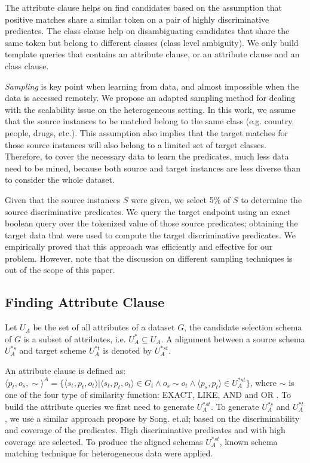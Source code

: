 The attribute clause helps on find candidates based on the assumption that positive matches share a similar token on a pair of highly discriminative predicates. The class clause help on disambiguating candidates that share the same token but belong to different classes (class level ambiguity).  We only build template queries that contains an attribute clause, or an attribute clause and an class clause. 


\emph{Sampling} is key point when learning from data, and almost impossible when the data is accessed remotely. We propose an adapted sampling method for dealing with the scalability issue on the heterogeneous setting. In this work, we assume that the source instances to be matched belong to the same class (e.g. country, people, drugs, etc.). This assumption also implies that the target matches for those source instances will also belong to a limited set of target classes. Therefore, to cover the necessary data to learn the predicates, much less data need to be mined, because both source and target instances are less diverse than to consider the whole dataset.

Given that the source instances $S$ were given, we select 5\% of $S$ to determine the source discriminative predicates. We query the target endpoint using an exact boolean query over the tokenized value of those source predicates; obtaining the target data that were used to compute the target discriminative predicates. We empirically proved that this approach was efficiently and effective for our problem. However, note that the discussion on different sampling techniques is out of the scope of this paper.

\subsection{Finding Attribute Clause}

Let $U_A$ be the set of all attributes of a dataset $G$, the candidate selection schema of $G$ is a subset of attributes, i.e. $U^*_A  \subseteq U_A$.  A alignment between a source schema $U^{*s}_A$ and target scheme $U^{*t}_A$ is denoted by $U^{*st}_A$.

An attribute clause is defined as: $\langle p_t,o_s,\sim \rangle^A=\{\langle s_t,p_t,o_t \rangle | \langle s_t,p_t,o_t \rangle \in G_t \land o_s\sim o_t \land \langle p_s, p_t \rangle \in U^{*st}_A\}$, where $\sim$ is one of the four type of similarity function: EXACT, LIKE, AND and  OR . To build the attribute queries we first need to generate $U^{*st}_A$. To generate $U^{*s}_A$ and $U^{*t}_A$, we use a similar approach propose by Song. et.al; based on the discriminability and coverage of the predicates. High discriminative predicates and with high coverage are selected. To produce the aligned schemas $U^{*st}_A$, known schema matching technique for heterogeneous data were applied.  

